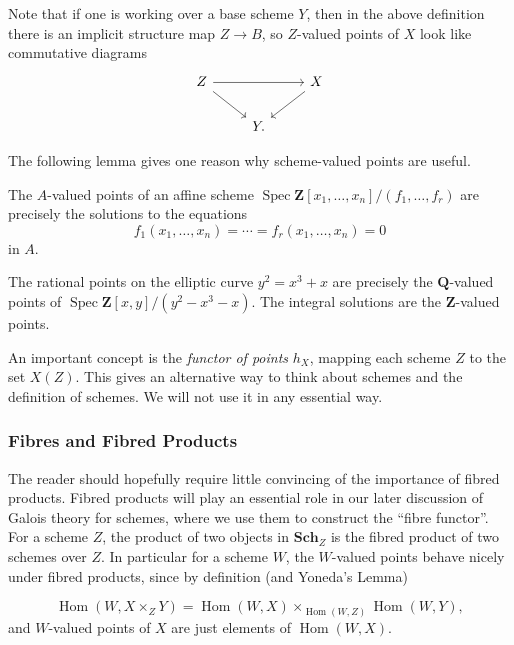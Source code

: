 \documentclass[11pt,openany]{book} %
\newcommand{\Z}{\mathbf{Z}}
\newcommand{\Q}{\mathbf{Q}}
\newcommand{\spc}{\operatorname{Spec}}
\begin{document}
Note that if one is working over a base scheme $Y$, then in the above definition there is an implicit structure map $Z \to B$, so $Z$-valued points of $X$ look like commutative diagrams
\[
\begin{tikzcd}
Z \ar[rd] \ar[rr] & & X \ar[ld] \\ & Y.
\end{tikzcd}
\]

The following lemma gives one reason why scheme-valued points are useful.\\

\begin{lemma}
The $A$-valued points of an affine scheme $\spc \Z[x_1,\ldots,x_n]/(f_1,\ldots,f_r)$ are precisely the solutions to the equations
\[
f_1(x_1,\ldots,x_n) = \cdots = f_r(x_1,\ldots,x_n) = 0
\]
in $A$.
\end{lemma}
\medskip

\begin{example}
The rational points on the elliptic curve $y^2 = x^3 + x$ are precisely the $\Q$-valued points of $\spc \Z[x,y]/(y^2 - x^3 - x)$. The integral solutions are the $\Z$-valued points.
\end{example}

\begin{remark}
An important concept is the \emph{functor of points} $h_X$, mapping each scheme $Z$ to the set $X(Z)$. This gives an alternative way to think about schemes and the definition of schemes. We will not use it in any essential way.
\end{remark}

\subsubsection{Fibres and Fibred Products}

The reader should hopefully require little convincing of the importance of fibred products. Fibred products will play an essential role in our later discussion of Galois theory for schemes, where we use them to construct the ``fibre functor''.\\

For a scheme $Z$, the product of two objects in $\mathbf{Sch}_Z$ is the fibred product of two schemes over $Z$. In particular for a scheme $W$, the $W$-valued points behave nicely under fibred products, since by definition (and Yoneda's Lemma)

\[
\operatorname{Hom}(W,X \times_Z Y) = \operatorname{Hom}(W,X) \times_{\operatorname{Hom}(W,Z)} \operatorname{Hom}(W, Y),
\]
and $W$-valued points of $X$ are just elements of $\operatorname{Hom}(W,X)$.\\
\end{document}
